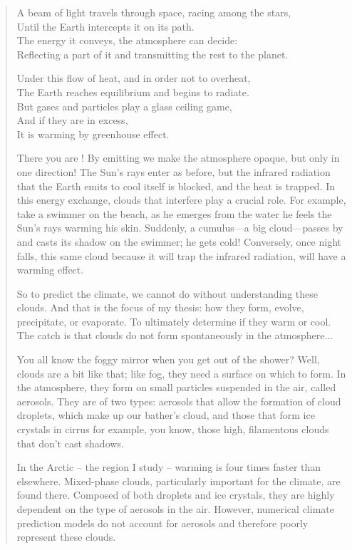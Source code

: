 \begin{quote}    
    A beam of light travels through space, racing among the stars,\\
    Until the Earth intercepts it on its path.\\
    The energy it conveys, the atmosphere can decide:\\
    Reflecting a part of it and transmitting the rest to the planet.\

    Under this flow of heat, and in order not to overheat,\\
    The Earth reaches equilibrium and begins to radiate.\\
    But gases and particles play a glass ceiling game,\\
    And if they are in excess,\\
    It is warming by greenhouse effect.\
    
    There you are !
    By emitting  we make the atmosphere opaque,
    but only in one direction!
    The Sun's rays enter as before,
    but the infrared radiation that the Earth emits
    to cool itself is blocked, and the heat is trapped.
    In this energy exchange, clouds that interfere
    play a crucial role.
    For example, take a swimmer on the beach,
    as he emerges from the water he feels
    the Sun's rays warming his skin.
    Suddenly, a cumulus\----a big cloud\----passes by and casts its shadow on the swimmer; he gets cold!
    Conversely, once night falls,
    this same cloud because it will trap
    the infrared radiation, will have a warming effect.\
    
    So to predict the climate,
    we cannot do without understanding these clouds.
    And that is the focus of my thesis:
    how they form, evolve, precipitate, or evaporate.
    To ultimately determine if they warm or cool.
    The catch is that clouds do not form
    spontaneously in the atmosphere...\
    
    You all know the foggy mirror when you
    get out of the shower?
    Well, clouds are a bit like that; like fog,
    they need a surface on which to form.
    In the atmosphere, they form on small
    particles suspended in the air, called aerosols.
    They are of two types: aerosols that
    allow the formation of cloud droplets,
    which make up our bather's cloud, and
    those that form ice crystals in cirrus
    for example, you know, those high,
    filamentous clouds that don't cast shadows.\
    
    In the Arctic – the region I study –
    warming is four times faster than elsewhere.
    Mixed-phase clouds, particularly important
    for the climate, are found there.
    Composed of both droplets and ice crystals,
    they are highly dependent on the type of aerosols in the air.
    However, numerical climate prediction models
    do not account for aerosols and therefore poorly represent these clouds.\
    

\end{quote}
